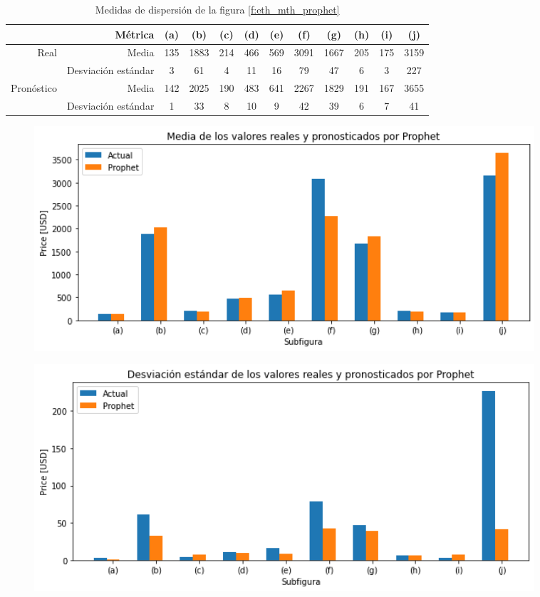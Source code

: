 \documentclass[a4paper,10pt]{article}
\begin{document}
\begin{table}[H]
 \begin{center}
 \resizebox{12cm}{!} {
  \begin{tabular}{|r|r|c|c|c|c|c|c|c|c|c|c|}
    & Métrica & (a) & (b) & (c) & (d) & (e) & (f) & (g) & (h) & (i) & (j) \\ \hline
    Real & Media & 135 & 1883 & 214 & 466 & 569 & 3091 & 1667 & 205 & 175 & 3159\\
    & Desviación estándar & 3 & 61 & 4 & 11 & 16 & 79 & 47 & 6 & 3 & 227 \\
    Pronóstico & Media & 142 & 2025 & 190 & 483 & 641 & 2267 & 1829 & 191 & 167 & 3655\\
    & Desviación estándar & 1 & 33 & 8 & 10 & 9 & 42 & 39 & 6 & 7 & 41\\ \hline
  \end{tabular}
  }
  \caption{Medidas de dispersión de la figura \ref{f:eth_mth_prophet}}
  \label{tab:eth_mh_avestd}
 \end{center}
\end{table}

\begin{figure}[H]
\centering
\includegraphics[width=0.9\textwidth]{./plots/prophet/eth/month/ave}
\label{f:eth_ave_mh}
\end{figure}


\begin{figure}[H]
\centering
\includegraphics[width=0.9\textwidth]{./plots/prophet/eth/month/std}
\label{f:eth_std_mh}
\end{figure}
\end{document}
